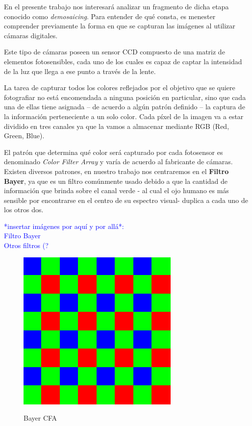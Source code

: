 \documentclass[a4paper]{article}
\begin{document}
En el presente trabajo nos interesará analizar un fragmento de dicha etapa conocido como \emph{demosaicing}. Para entender de qué consta, es menester comprender previamente la forma en que se capturan las imágenes al utilizar cámaras digitales.

Este tipo de cámaras poseen un sensor CCD compuesto de una matriz de elementos fotosensibles, cada uno de los cuales es capaz de captar la intensidad de la luz que llega a ese punto a través de la lente. 

La tarea de capturar todos los colores reflejados por el objetivo que se quiere fotografiar no está encomendada a ninguna posición en particular, sino que cada una de ellas tiene asignada – de acuerdo a algún patrón definido  – la captura de la información perteneciente a un solo color. Cada p\'ixel de la imagen va a estar dividido en tres canales ya que la vamos a almacenar mediante RGB (Red, Green, Blue).

El patr\'on que determina qué color será capturado por cada fotosensor es denominado \emph{Color Filter Array} y var\'ia de acuerdo al fabricante de c\'amaras. Existen diversos patrones, en nuestro trabajo nos centraremos en el \textbf{Filtro Bayer}, ya que es un filtro com\'unmente usado debido a que la cantidad de informaci\'on que brinda sobre el canal verde - al cual el ojo humano es más sensible por encontrarse en el centro de su espectro visual-  duplica a cada uno de los otros dos.

\textcolor{blue}{*insertar imágenes por aquí y por allá*:\\
Filtro Bayer \\
Otros filtros (?
}

\begin{figure}[h!]
	\caption{Bayer CFA}
	\begin{center}
	\includegraphics[scale=0.36]{imagenes/BayerFilter}
	\label{Bayer}
  \end{center}
\end{figure}
\end{document}
